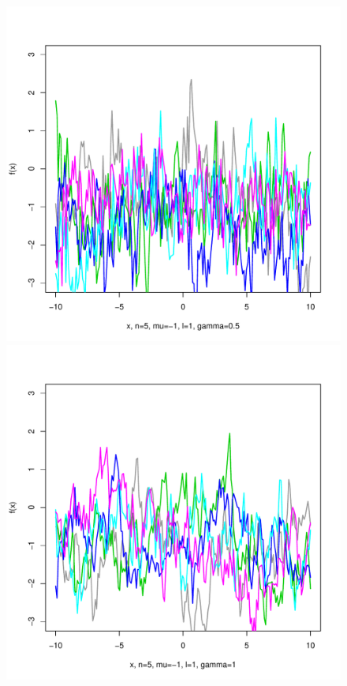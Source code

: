 \documentclass[12pt,letterpaper]{article}
\begin{document}
\begin{figure}
\begin{center}
\includegraphics[scale=0.2]{hw321/n5-m-1-l1-g1.pdf}
\includegraphics[scale=0.2]{hw321/n5-m-1-l1-g2.pdf}

\end{center}
\end{figure}
\end{document}
